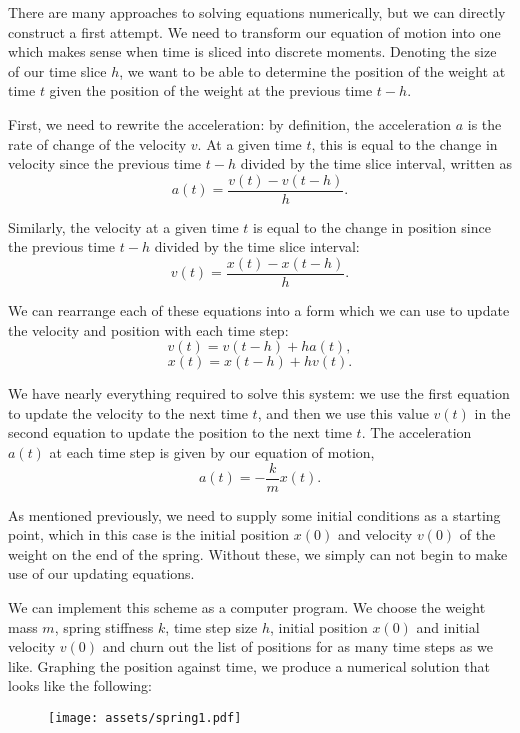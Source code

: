 \documentclass[11pt]{article}
\begin{document}
There are many approaches to solving equations numerically, but we can directly construct a first attempt. We need to transform our equation of motion into one which makes sense when time is sliced into discrete moments. Denoting the size of our time slice $h$, we want to be able to determine the position of the weight at time $t$ given the position of the weight at the previous time $t-h$.
\newline

First, we need to rewrite the acceleration: by definition, the acceleration $a$ is the rate of change of the velocity $v$. At a given time $t$, this is equal to the change in velocity since the previous time $t-h$ divided by the time slice interval, written as
$$a(t)=\frac{v(t)-v(t-h)}{h}.$$

Similarly, the velocity at a given time $t$ is equal to the change in position since the previous time $t-h$ divided by the time slice interval:
$$v(t)=\frac{x(t)-x(t-h)}{h}.$$
\newpage

We can rearrange each of these equations into a form which we can use to update the velocity and position with each time step:
$$v(t)=v(t-h)+ha(t),$$
$$x(t)=x(t-h)+hv(t).$$

We have nearly everything required to solve this system: we use the first equation to update the velocity to the next time $t$, and then we use this value $v(t)$ in the second equation to update the position to the next time $t$. The acceleration $a(t)$ at each time step is given by our equation of motion,
$$a(t)=-\frac{k}{m}x(t).$$

As mentioned previously, we need to supply some initial conditions as a starting point, which in this case is the initial position $x(0)$ and velocity $v(0)$ of the weight on the end of the spring. Without these, we simply can not begin to make use of our updating equations.
\newline

We can implement this scheme as a computer program. We choose the weight mass $m$, spring stiffness $k$, time step size $h$, initial position $x(0)$ and initial velocity $v(0)$ and churn out the list of positions for as many time steps as we like. Graphing the position against time, we produce a numerical solution that looks like the following:

\begin{figure}[htbp]
\centering
\texttt{[image: assets/spring1.pdf]}
\label{plot:spring1}
\end{figure}
\newpage
\end{document}
